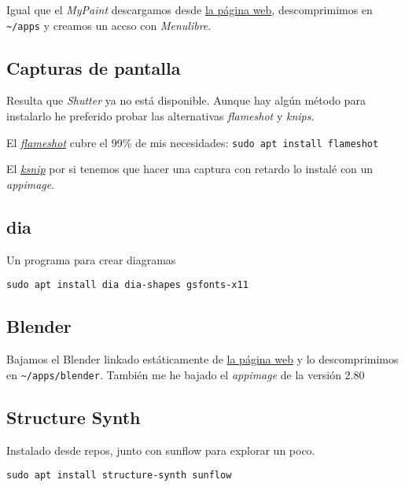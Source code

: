 \documentclass[
  12pt,
  spanish,
]{article}
\begin{document}
Igual que el \emph{MyPaint} descargamos desde
\href{http://al.chemy.org}{la página web}, descomprimimos en
\texttt{\textasciitilde{}/apps} y creamos un accso con \emph{Menulibre}.

\hypertarget{capturas-de-pantalla}{%
\subsection{Capturas de pantalla}\label{capturas-de-pantalla}}

Resulta que \emph{Shutter} ya no está disponible. Aunque hay algún
método para instalarlo he preferido probar las alternativas
\emph{flameshot} y \emph{knips}.

El \href{https://flameshot.js.org/\#/}{\emph{flameshot}} cubre el 99\%
de mis necesidades: \texttt{sudo\ apt\ install\ flameshot}

El \href{https://github.com/DamirPorobic/ksnip}{\emph{ksnip}} por si
tenemos que hacer una captura con retardo lo instalé con un
\emph{appimage}.

\hypertarget{dia}{%
\subsection{dia}\label{dia}}

Un programa para crear diagramas

\begin{verbatim}
sudo apt install dia dia-shapes gsfonts-x11
\end{verbatim}

\hypertarget{blender}{%
\subsection{Blender}\label{blender}}

Bajamos el Blender linkado estáticamente de
\href{https://www.blender.org}{la página web} y lo descomprimimos en
\texttt{\textasciitilde{}/apps/blender}. También me he bajado el
\emph{appimage} de la versión 2.80

\hypertarget{structure-synth}{%
\subsection{Structure Synth}\label{structure-synth}}

Instalado desde repos, junto con sunflow para explorar un poco.

\begin{verbatim}
sudo apt install structure-synth sunflow
\end{verbatim}
\end{document}
